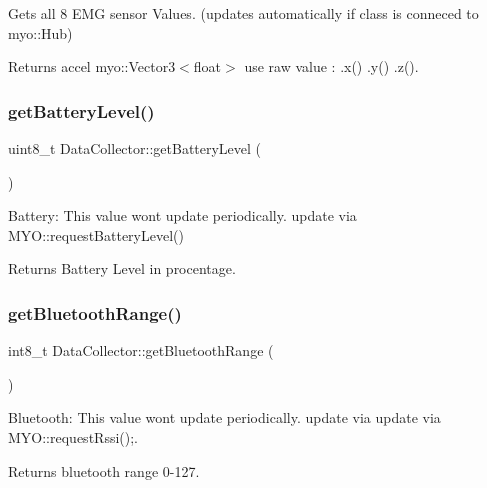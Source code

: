 Gets all 8 E\+MG sensor Values. (updates automatically if class is conneced to myo\+::\+Hub) 

\begin{DoxyReturn}{Returns}
accel myo\+::\+Vector3$<$float$>$ use raw value \+: .x() .y() .z(). 
\end{DoxyReturn}
\mbox{\label{class_data_collector_a376b4be3194c56e25084df4097968a46}} 
\subsubsection{get\+Battery\+Level()}
{\footnotesize\ttfamily uint8\+\_\+t Data\+Collector\+::get\+Battery\+Level (\begin{DoxyParamCaption}{ }\end{DoxyParamCaption})\hspace{0.3cm}{\ttfamily [inline]}}



Battery\+: This value wont update periodically. update via M\+Y\+O\+::request\+Battery\+Level() 

\begin{DoxyReturn}{Returns}
Battery Level in procentage. 
\end{DoxyReturn}
\mbox{\label{class_data_collector_a4992b2e777defed813c7ce15a73bc84b}} 
\subsubsection{get\+Bluetooth\+Range()}
{\footnotesize\ttfamily int8\+\_\+t Data\+Collector\+::get\+Bluetooth\+Range (\begin{DoxyParamCaption}{ }\end{DoxyParamCaption})\hspace{0.3cm}{\ttfamily [inline]}}



Bluetooth\+: This value wont update periodically. update via update via M\+Y\+O\+::request\+Rssi();. 

\begin{DoxyReturn}{Returns}
bluetooth range 0-\/127. 
\end{DoxyReturn}
\mbox{\label{class_data_collector_a2dbac95176fb77c1714573e41ba4490f}} 
